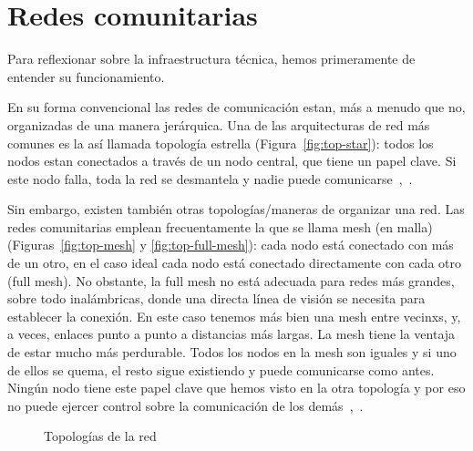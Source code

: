 \section{Redes comunitarias}

Para reflexionar sobre la infraestructura técnica, hemos primeramente de entender su funcionamiento.

En su forma convencional las redes de comunicación estan, más a menudo que no, organizadas de una manera jerárquica.
Una de las arquitecturas de red más comunes es la así llamada topología estrella (Figura~\vref{fig:top-star}):
todos los nodos estan conectados a través de un nodo central, que tiene un papel clave.
Si este nodo falla, toda la red se desmantela y nadie puede comunicarse~\autocite{Mabb2014},~\autocite{Medosch2004}.

Sin embargo, existen también otras topologías/maneras de organizar una red.
Las redes comunitarias emplean frecuentamente la que se llama mesh (en malla) (Figuras~\vref{fig:top-mesh} y \vref{fig:top-full-mesh}):
cada nodo está conectado con más de un otro, en el caso ideal cada nodo está conectado directamente con cada otro (full mesh).
No obstante, la full mesh no está adecuada para redes más grandes, sobre todo inalámbricas, donde una directa línea de visión se necesita para establecer la conexión.
En este caso tenemos más bien una mesh entre vecinxs, y, a veces, enlaces punto a punto a distancias más largas.
La mesh tiene la ventaja de estar mucho más perdurable.
Todos los nodos en la mesh son iguales y si uno de ellos se quema, el resto sigue existiendo y puede comunicarse como antes.
Ningún nodo tiene este papel clave que hemos visto en la otra topología y por eso no puede ejercer control sobre la comunicación de los demás~\autocite{FiTre2015},~\autocite{Medosch2004}.

\begin{figure}[b]
\centering
{} \quad
{} \quad
{}
\caption[Topologies]{Topologías de la red} %
\label{fig:topologies}
\end{figure}

